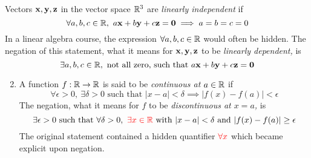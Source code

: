 \begin{examples}{}{}
	\exstart Vectors ${\mathbf{x}},{\mathbf{y}},{\mathbf{z}}$ in the vector space $\mathbb{R}^3$ are \emph{linearly independent} if
	\[
		\forall a,b,c\in\R,\ a\vx+b\vy+c\vz=\V0\implies a=b=c=0
	\]
	In a linear algebra course, the expression $\forall a,b,c\in\mathbb{R}$ would often be hidden. The negation of this statement, what it means for ${\mathbf{x}},{\mathbf{y}},{\mathbf{z}}$ to be \emph{linearly dependent,} is
	\[
		\exists a,b,c\in\mathbb{R},\text{ not all zero, such that }a{\mathbf{x}}+b{\mathbf{y}}+c{\mathbf{z}}=\mathbf{0}
	\]
	\begin{enumerate}\setcounter{enumi}{1}
	  \item A function $f:\mathbb{R}\to\mathbb{R}$ is said to be \emph{continuous at $a\in\mathbb{R}$} if
		\[
			\forall\epsilon >0,\ \exists\delta>0\text{ such that }|x-a|<\delta\implies |f(x)-f(a)|<\epsilon
		\]
		The negation, what it means for $f$ to be \emph{discontinuous at $x=a$,} is
		\[
			\exists\epsilon>0\text{ such that }\forall\delta>0,\ \textcolor{red}{\exists x\in\mathbb{R}}\text{ with }|x-a|<\delta\text{ and }|f(x)-f(a)|\ge\epsilon
		\]
		The original statement contained a hidden quantifier $\textcolor{red}{\forall x}$ which became explicit upon negation.
	\end{enumerate}
\end{examples}


\goodbreak


